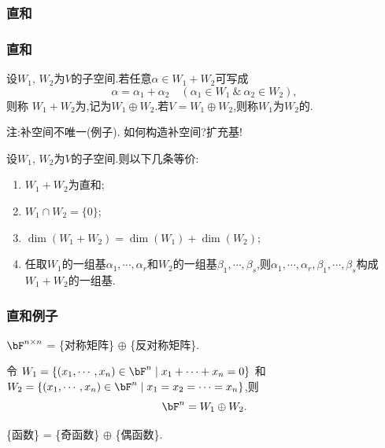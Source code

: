 \subsubsection{直和}
\begin{frame}\frametitle{直和}

\begin{definition}[直和]
设$W_1$, $W_2$为$V$的子空间.\pp 若任意$\alpha\in W_1+W_2$可写成
\[\alpha = \alpha_1 + \alpha_2 \quad (\alpha_1\in W_1\ \&\ \alpha_2\in W_2),\]
则称 $W_1+W_2$为,记为$W_1\oplus W_2$.\pp 若$V=W_1\oplus W_2$,则称$W_1$为$W_2$的.
\end{definition}
\pp
注:补空间不唯一(例子). 如何构造补空间?扩充基!
\pp
\begin{theorem}
设$W_1$, $W_2$为$V$的子空间.则以下几条等价:\pp
\begin{enumerate}
\item $W_1+W_2$为直和;\pp
\item $W_1\cap W_2=\{0\}$;\pp
\item $\dim(W_1+W_2) = \dim(W_1) + \dim(W_2)$;\pp
\item 任取$W_1$的一组基$\alpha_1,\cdots,\alpha_r$和$W_2$的一组基$\beta_1,\cdots,\beta_s$,则$\alpha_1,\cdots,\alpha_r,\beta_1,\cdots,\beta_s$构成$W_1+W_2$的一组基.
\end{enumerate}
\end{theorem}
\end{frame}






\begin{frame}\frametitle{直和例子}
\begin{example}
\begin{center}
$\bF^{n\times n}$ = \{对称矩阵\} $\oplus$ \{反对称矩阵\}.
\end{center}
\end{example}
\pp
\begin{example}令 $W_1=\{(x_1,\cdots,x_n)\in \bF^n\mid x_1+\cdots+x_n=0\}$ 和 $W_2=\{(x_1,\cdots,x_n)\in \bF^n\mid x_1=x_2=\cdots=x_n\}$,则
\[\bF^{n} = W_1 \oplus W_2.\]
\end{example}
\pp
\begin{example}
\begin{center}
\{函数\} = \{奇函数\} $\oplus$ \{偶函数\}.
\end{center}
\end{example}
\end{frame}